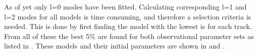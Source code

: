 

As of yet only l=0 modes have been fitted. Calculating corresponding l=1 and l=2 modes for all models is time consuming, and therefore a selection criteria is needed. This is done by first finding the model with the lowest \chis is for each track. From all of these the best 5\% are found for both observational parameter sets as listed in . These models and their initial parameters are shown in  and . 

